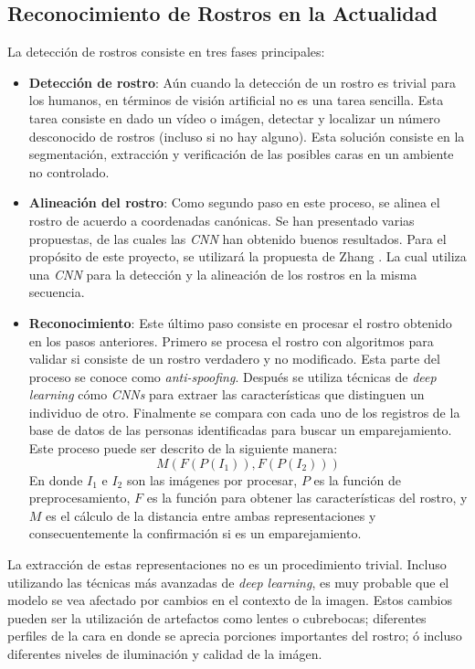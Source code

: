 \documentclass[letterpaper, 10 pt, conference]{ieeeconf}  %
\begin{document}
    \subsection{Reconocimiento de Rostros en la Actualidad}
    La detección de rostros consiste en tres fases principales:
    \begin{itemize}
        \item \textbf{Detección de rostro}: Aún cuando la detección de un rostro es trivial
            para los humanos, en términos de visión artificial no es una tarea sencilla. Esta
            tarea consiste en dado un vídeo o imágen, detectar y localizar un número
            desconocido de rostros (incluso si no hay alguno). Esta solución consiste en la
            segmentación, extracción y verificación de las posibles caras en un ambiente
            no controlado. \cite{FaceDetection2001}

        \item \textbf{Alineación del rostro}: Como segundo paso en este proceso, se alinea
            el rostro de acuerdo a coordenadas canónicas. \cite{Wang2021} Se han presentado
            varias propuestas, de las cuales las \textit{CNN} han obtenido buenos resultados.
            Para el propósito de este proyecto, se utilizará la propuesta de Zhang \cite{MTCNN}.
            La cual utiliza una \textit{CNN} para la detección y la alineación de los rostros
            en la misma secuencia.

        \item \textbf{Reconocimiento}: Este último paso consiste en procesar el rostro obtenido
            en los pasos anteriores. Primero se procesa el rostro con algoritmos para validar
            si consiste de un rostro verdadero y no modificado. Esta parte del proceso se conoce
            como \textit{anti-spoofing}. Después se utiliza técnicas de \textit{deep learning} cómo
            \textit{CNNs} para extraer las características que distinguen un individuo de otro.
            Finalmente se compara con cada uno de los registros de la base de datos de las
            personas identificadas para buscar un emparejamiento.
            Este proceso puede ser descrito de la siguiente manera: \cite{Wang2021}
                \[ M(F(P(I_1)), F(P(I_2))) \]
            En donde \textit{$I_1$} e \textit{$I_2$} son las imágenes por procesar, \textit{$P$}
            es la función de preprocesamiento, \textit{$F$} es la función para obtener las
            características del rostro, y \textit{$M$} es el cálculo de la distancia entre
            ambas representaciones y consecuentemente la confirmación si es un emparejamiento.
    \end{itemize}
    La extracción de estas representaciones no es un procedimiento trivial. Incluso utilizando
    las técnicas más avanzadas de \textit{deep learning}, es muy probable que el modelo se vea
    afectado por cambios en el contexto de la imagen. Estos cambios pueden ser la utilización
    de artefactos como lentes o cubrebocas; diferentes perfiles de la cara en donde se aprecia
    porciones importantes del rostro; ó incluso diferentes niveles de iluminación y calidad de la
    imágen. \cite{Bodini2019}
\end{document}
